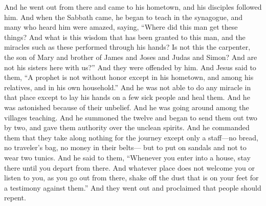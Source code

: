 \begin{biblechapter} %
 And he went out from there and came to his hometown, and his disciples followed him.
\verse And when the Sabbath came, he began to teach in the synagogue, and many who heard him were amazed, saying, “Where did this man get these things? And what is this wisdom that has been granted to this man, and the miracles such as these performed through his hands?
\verse Is not this the carpenter, the son of Mary and brother of James and Joses and Judas and Simon? And are not his sisters here with us?” And they were offended by him.
\verse And Jesus said to them, “A prophet is not without honor except in his hometown, and among his relatives, and in his own household.”
\verse And he was not able to do any miracle in that place except to lay his hands on a few sick people and heal them.
\verse And he was astonished because of their unbelief.
 And he was going around among the villages teaching.
\verse And he summoned the twelve and began to send them out two by two, and gave them authority over the unclean spirits.
\verse And he commanded them that they take along nothing for the journey except only a staff—no bread, no traveler’s bag, no money in their belts—
\verse but to put on sandals and not to wear two tunics.
\verse And he said to them, “Whenever you enter into a house, stay there until you depart from there.
\verse And whatever place does not welcome you or listen to you, as you go out from there, shake off the dust that is on your feet for a testimony against them.”
\verse And they went out and proclaimed that people should repent.

\end{biblechapter}
